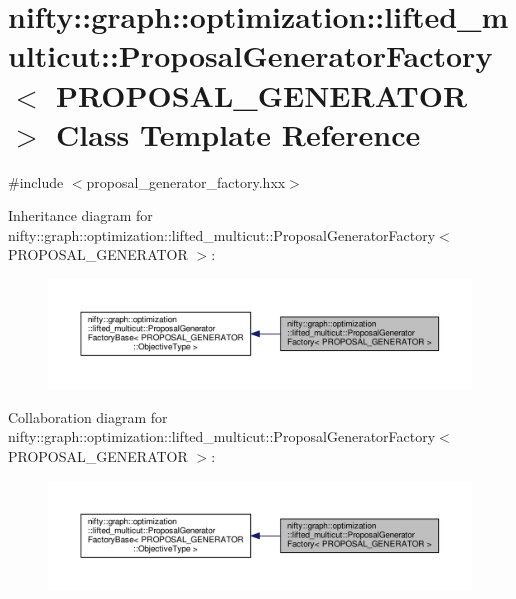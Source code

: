 \hypertarget{classnifty_1_1graph_1_1optimization_1_1lifted__multicut_1_1ProposalGeneratorFactory}{}\section{nifty\+:\+:graph\+:\+:optimization\+:\+:lifted\+\_\+multicut\+:\+:Proposal\+Generator\+Factory$<$ P\+R\+O\+P\+O\+S\+A\+L\+\_\+\+G\+E\+N\+E\+R\+A\+T\+O\+R $>$ Class Template Reference}
\label{classnifty_1_1graph_1_1optimization_1_1lifted__multicut_1_1ProposalGeneratorFactory}


{\ttfamily \#include $<$proposal\+\_\+generator\+\_\+factory.\+hxx$>$}



Inheritance diagram for nifty\+:\+:graph\+:\+:optimization\+:\+:lifted\+\_\+multicut\+:\+:Proposal\+Generator\+Factory$<$ P\+R\+O\+P\+O\+S\+A\+L\+\_\+\+G\+E\+N\+E\+R\+A\+T\+O\+R $>$\+:\nopagebreak
\begin{figure}[H]
\begin{center}
\leavevmode
\includegraphics[width=350pt]{classnifty_1_1graph_1_1optimization_1_1lifted__multicut_1_1ProposalGeneratorFactory__inherit__graph}
\end{center}
\end{figure}


Collaboration diagram for nifty\+:\+:graph\+:\+:optimization\+:\+:lifted\+\_\+multicut\+:\+:Proposal\+Generator\+Factory$<$ P\+R\+O\+P\+O\+S\+A\+L\+\_\+\+G\+E\+N\+E\+R\+A\+T\+O\+R $>$\+:\nopagebreak
\begin{figure}[H]
\begin{center}
\leavevmode
\includegraphics[width=350pt]{classnifty_1_1graph_1_1optimization_1_1lifted__multicut_1_1ProposalGeneratorFactory__coll__graph}
\end{center}
\end{figure}
